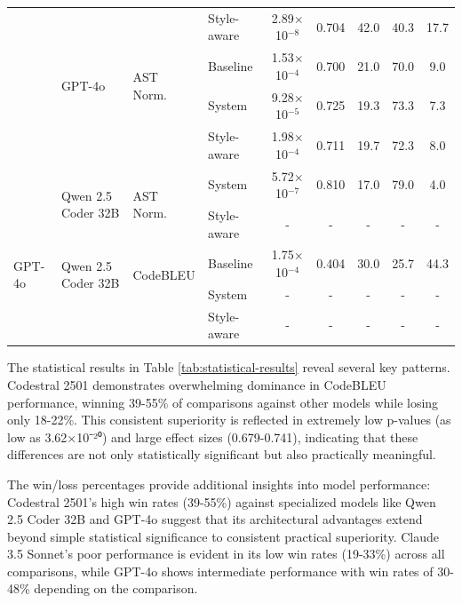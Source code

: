\begin{table}[h!]
{\begin{tabular}{|l|l|l|l|c|c|c|c|c|}
\cline{4-9}
& & & Style-aware & 2.89$\times$10$^{-8}$ & 0.704 & 42.0 & 40.3 & 17.7 \\
\cline{2-9}
& \multirow{2}{*}{GPT-4o} & \multirow{2}{*}{AST Norm.} & Baseline & 1.53$\times$10$^{-4}$ & 0.700 & 21.0 & 70.0 & 9.0 \\
\cline{4-9}
& & & System & 9.28$\times$10$^{-5}$ & 0.725 & 19.3 & 73.3 & 7.3 \\
\cline{4-9}
& & & Style-aware & 1.98$\times$10$^{-4}$ & 0.711 & 19.7 & 72.3 & 8.0 \\
\cline{2-9}
& \multirow{2}{*}{Qwen 2.5 Coder 32B} & \multirow{2}{*}{AST Norm.} & System & 5.72$\times$10$^{-7}$ & 0.810 & 17.0 & 79.0 & 4.0 \\
\cline{4-9}
& & & Style-aware & - & - & - & - & - \\
\hline
\multirow{2}{*}{GPT-4o} & \multirow{2}{*}{Qwen 2.5 Coder 32B} & \multirow{2}{*}{CodeBLEU} & Baseline & 1.75$\times$10$^{-4}$ & 0.404 & 30.0 & 25.7 & 44.3 \\
\cline{4-9}
& & & System & - & - & - & - & - \\
\cline{4-9}
& & & Style-aware & - & - & - & - & - \\
\hline
\end{tabular}%
}
\end{table}

The statistical results in Table \ref{tab:statistical-results} reveal several key patterns. Codestral 2501 demonstrates overwhelming dominance in CodeBLEU performance, winning 39-55\% of comparisons against other models while losing only 18-22\%. This consistent superiority is reflected in extremely low p-values (as low as 3.62×10⁻²⁰) and large effect sizes (0.679-0.741), indicating that these differences are not only statistically significant but also practically meaningful.

The win/loss percentages provide additional insights into model performance: Codestral 2501's high win rates (39-55\%) against specialized models like Qwen 2.5 Coder 32B and GPT-4o suggest that its architectural advantages extend beyond simple statistical significance to consistent practical superiority. Claude 3.5 Sonnet's poor performance is evident in its low win rates (19-33\%) across all comparisons, while GPT-4o shows intermediate performance with win rates of 30-48\% depending on the comparison.

